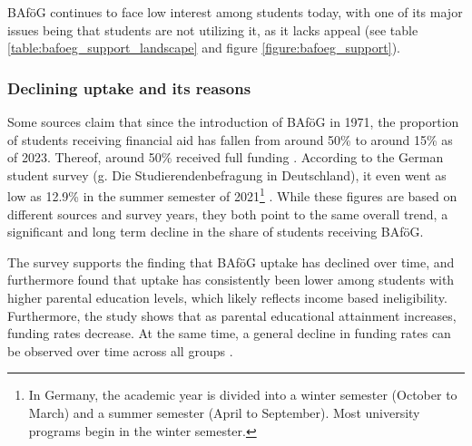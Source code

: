 BAföG continues to face low interest among students today, with one of its major issues being that students are not utilizing it, as it lacks appeal (see table \ref{table:bafoeg_support_landscape} and figure \ref{figure:bafoeg_support}). 

\subsubsection{Declining uptake and its reasons} \label{subsection:declining-uptake}
Some sources claim that since the introduction of BAföG in 1971, the proportion of students receiving financial aid has fallen from around 50\% to around 15\% as of 2023. Thereof, around 50\% received full funding \citep{meier_bafog_2024}. According to the German student survey (g. Die Studierendenbefragung in Deutschland), it even went as low as 12.9\% in the summer semester of 2021\footnote{
In Germany, the academic year is divided into a winter semester (October to March) and a summer semester (April to September). Most university programs begin in the winter semester.
} \citep{kroher_studierendenbefragung_2023}. While these figures are based on different sources and survey years, they both point to the same overall trend, a significant and long term decline in the share of students receiving BAföG.

The survey supports the finding that BAföG uptake has declined over time, and furthermore found that uptake has consistently been lower among students with higher parental education levels, which likely reflects income based ineligibility. Furthermore, the study shows that as parental educational attainment increases, funding rates decrease. At the same time, a general decline in funding rates can be observed over time across all groups \citep{kroher_studierendenbefragung_2023}.


